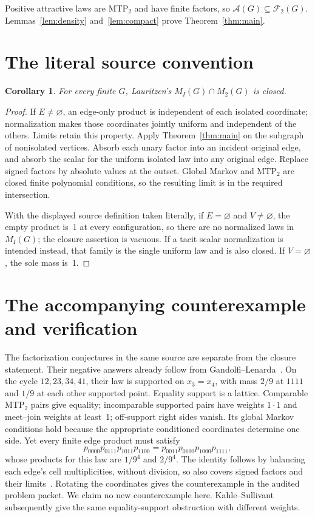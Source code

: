 \documentclass[11pt]{article}
\newtheorem{corollary}[theorem]{Corollary}
\newcommand{\F}{\mathcal F_2(G)}
\newcommand{\A}{\mathcal A(G)}
\begin{document}
Positive attractive laws are MTP$_2$ and have finite factors, so $\A\subseteq\F$. Lemmas~\ref{lem:density} and~\ref{lem:compact} prove Theorem~\ref{thm:main}.

\section{The literal source convention}\label{sec:literal}
\begin{corollary}
For every finite $G$, Lauritzen's $M_I(G)\cap M_2(G)$ is closed.
\end{corollary}
\begin{proof}
If $E\ne\varnothing$, an edge-only product is independent of each isolated coordinate; normalization makes those coordinates jointly uniform and independent of the others. Limits retain this property. Apply Theorem~\ref{thm:main} on the subgraph of nonisolated vertices. Absorb each unary factor into an incident original edge, and absorb the scalar for the uniform isolated law into any original edge. Replace signed factors by absolute values at the outset. Global Markov and MTP$_2$ are closed finite polynomial conditions, so the resulting limit is in the required intersection.

With the displayed source definition taken literally, if $E=\varnothing$ and $V\ne\varnothing$, the empty product is~1 at every configuration, so there are no normalized laws in $M_I(G)$; the closure assertion is vacuous. If a tacit scalar normalization is intended instead, that family is the single uniform law and is also closed. If $V=\varnothing$, the sole mass is~1.
\end{proof}

\section{The accompanying counterexample and verification}
The factorization conjectures in the same source are separate from the closure statement. Their negative answers already follow from Gandolfi--Lenarda~\cite[Lemma~5.2]{GL2017}. On the cycle $12,23,34,41$, their law is supported on $x_3=x_4$, with mass $2/9$ at $1111$ and $1/9$ at each other supported point. Equality support is a lattice. Comparable MTP$_2$ pairs give equality; incomparable supported pairs have weights $1\cdot1$ and meet--join weights at least~1; off-support right sides vanish. Its global Markov conditions hold because the appropriate conditioned coordinates determine one side. Yet every finite edge product must satisfy
\[
 p_{0000}p_{0111}p_{1011}p_{1100}
 =p_{0011}p_{0100}p_{1000}p_{1111},
\]
whose products for this law are $1/9^4$ and $2/9^4$. The identity follows by balancing each edge's cell multiplicities, without division, so also covers signed factors and their limits~\cite{GMS2006}. Rotating the coordinates gives the counterexample in the audited problem packet. We claim no new counterexample here. Kahle--Sullivant~\cite[Example~6.5]{KS2024} subsequently give the same equality-support obstruction with different weights.
\end{document}
